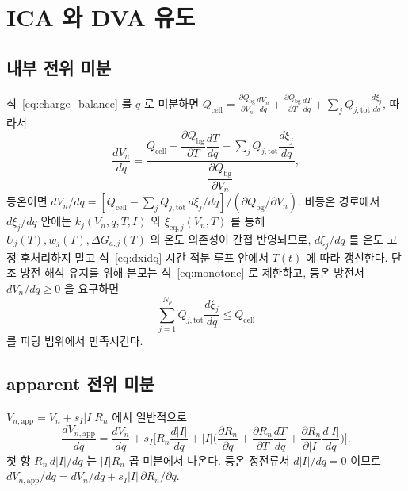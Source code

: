\documentclass[11pt,a4paper]{article}
\newcommand{\eq}{\mathrm{eq}}
\newcommand{\app}{\mathrm{app}}
\newcommand{\tot}{\mathrm{tot}}
\newcommand{\bg}{\mathrm{bg}}
\newcommand{\cell}{\mathrm{cell}}
\begin{document}
\section{ICA 와 DVA 유도}\label{sec:ica}
\subsection{내부 전위 미분}
식~\eqref{eq:charge_balance} 를 $q$ 로 미분하면
$Q_\cell=\frac{\partial Q_\bg}{\partial V_n}\frac{dV_n}{dq}+\frac{\partial Q_\bg}{\partial T}\frac{dT}{dq}
+\sum_j Q_{j,\tot}\frac{d\xi_j}{dq}$, 따라서
\begin{equation}
\frac{dV_n}{dq}=\frac{Q_\cell-\dfrac{\partial Q_\bg}{\partial T}\dfrac{dT}{dq}-\sum_j Q_{j,\tot}\dfrac{d\xi_j}{dq}}
{\dfrac{\partial Q_\bg}{\partial V_n}},
\label{eq:dVdq_gen}
\end{equation}
등온이면 $dV_n/dq=[Q_\cell-\sum_j Q_{j,\tot}\,d\xi_j/dq]/(\partial Q_\bg/\partial V_n)$. 비등온 경로에서
$d\xi_j/dq$ 안에는 $k_j(V_n,q,T,I)$ 와 $\xi_{\eq,j}(V_n,T)$ 를 통해 $U_j(T),w_j(T),\Delta G_{a,j}(T)$ 의
온도 의존성이 간접 반영되므로, $d\xi_j/dq$ 를 온도 고정 후처리하지 말고 식~\eqref{eq:dxidq} 시간 적분
루프 안에서 $T(t)$ 에 따라 갱신한다. 단조 방전 해석 유지를 위해 분모는 식~\eqref{eq:monotone} 로
제한하고, 등온 방전서 $dV_n/dq\ge0$ 을 요구하면
\begin{equation}
\boxed{\;\sum_{j=1}^{N_p}Q_{j,\tot}\frac{d\xi_j}{dq}\le Q_\cell\;}
\label{eq:monoconstraint}
\end{equation}
를 피팅 범위에서 만족시킨다.

\subsection{apparent 전위 미분}
$V_{n,\app}=V_n+s_I|I|R_n$ 에서 일반적으로
\begin{equation}
\frac{dV_{n,\app}}{dq}=\frac{dV_n}{dq}+s_I\Big[R_n\frac{d|I|}{dq}
+|I|\Big(\frac{\partial R_n}{\partial q}+\frac{\partial R_n}{\partial T}\frac{dT}{dq}+\frac{\partial R_n}{\partial|I|}\frac{d|I|}{dq}\Big)\Big].
\label{eq:dVappdq_gen}
\end{equation}
첫 항 $R_n\,d|I|/dq$ 는 $|I|R_n$ 곱 미분에서 나온다. 등온 정전류서 $d|I|/dq=0$ 이므로
$dV_{n,\app}/dq=dV_n/dq+s_I|I|\,\partial R_n/\partial q$.
\end{document}
